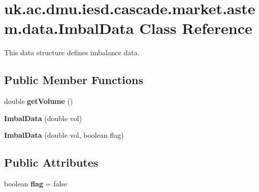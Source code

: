 \hypertarget{classuk_1_1ac_1_1dmu_1_1iesd_1_1cascade_1_1market_1_1astem_1_1data_1_1_imbal_data}{\section{uk.\-ac.\-dmu.\-iesd.\-cascade.\-market.\-astem.\-data.\-Imbal\-Data Class Reference}
\label{classuk_1_1ac_1_1dmu_1_1iesd_1_1cascade_1_1market_1_1astem_1_1data_1_1_imbal_data}
}


This data structure defines imbalance data.  


\subsection*{Public Member Functions}
\begin{DoxyCompactItemize}
\item 
\hypertarget{classuk_1_1ac_1_1dmu_1_1iesd_1_1cascade_1_1market_1_1astem_1_1data_1_1_imbal_data_a32824cb54e749796184020747127c011}{double {\bfseries get\-Volume} ()}\label{classuk_1_1ac_1_1dmu_1_1iesd_1_1cascade_1_1market_1_1astem_1_1data_1_1_imbal_data_a32824cb54e749796184020747127c011}

\item 
\hypertarget{classuk_1_1ac_1_1dmu_1_1iesd_1_1cascade_1_1market_1_1astem_1_1data_1_1_imbal_data_aff04a573c700ea855ffc55464539496d}{{\bfseries Imbal\-Data} (double vol)}\label{classuk_1_1ac_1_1dmu_1_1iesd_1_1cascade_1_1market_1_1astem_1_1data_1_1_imbal_data_aff04a573c700ea855ffc55464539496d}

\item 
\hypertarget{classuk_1_1ac_1_1dmu_1_1iesd_1_1cascade_1_1market_1_1astem_1_1data_1_1_imbal_data_a6832e17556c0a463c9f33377d2d4ee86}{{\bfseries Imbal\-Data} (double vol, boolean flag)}\label{classuk_1_1ac_1_1dmu_1_1iesd_1_1cascade_1_1market_1_1astem_1_1data_1_1_imbal_data_a6832e17556c0a463c9f33377d2d4ee86}

\end{DoxyCompactItemize}
\subsection*{Public Attributes}
\begin{DoxyCompactItemize}
\item 
\hypertarget{classuk_1_1ac_1_1dmu_1_1iesd_1_1cascade_1_1market_1_1astem_1_1data_1_1_imbal_data_ac1c7f2d30cff3581e4ba8cf5bb7181cc}{boolean {\bfseries flag} = false}\label{classuk_1_1ac_1_1dmu_1_1iesd_1_1cascade_1_1market_1_1astem_1_1data_1_1_imbal_data_ac1c7f2d30cff3581e4ba8cf5bb7181cc}

\end{DoxyCompactItemize}


